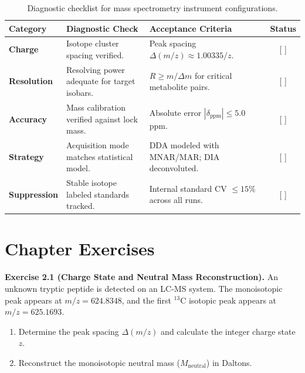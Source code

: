 \documentclass[11pt,twoside,openright]{book}
\begin{document}
\begin{table}[htbp]
\centering
\caption{Diagnostic checklist for mass spectrometry instrument configurations.}
\label{tab:ms_physics_checklist}
\small
\begin{tabularx}{\textwidth}{>{\raggedright\arraybackslash}l >{\raggedright\arraybackslash}p{5.2cm} >{\raggedright\arraybackslash}X c}
\toprule
\textbf{Category} & \textbf{Diagnostic Check} & \textbf{Acceptance Criteria} & \textbf{Status} \\
\midrule
\textbf{Charge} & Isotope cluster spacing verified. & Peak spacing $\Delta(m/z) \approx 1.00335/z$. & [ ] \\
\addlinespace
\textbf{Resolution} & Resolving power adequate for target isobars. & $R \ge m / \Delta m$ for critical metabolite pairs. & [ ] \\
\addlinespace
\textbf{Accuracy} & Mass calibration verified against lock mass. & Absolute error $|\delta_{\text{ppm}}| \le 5.0$ ppm. & [ ] \\
\addlinespace
\textbf{Strategy} & Acquisition mode matches statistical model. & DDA modeled with MNAR/MAR; DIA deconvoluted. & [ ] \\
\addlinespace
\textbf{Suppression} & Stable isotope labeled standards tracked. & Internal standard CV $\le 15\%$ across all runs. & [ ] \\
\bottomrule
\end{tabularx}
\end{table}

\FloatBarrier

\section{Chapter Exercises}
\label{sec:chapter_exercises}

\noindent\textbf{Exercise 2.1 (Charge State and Neutral Mass Reconstruction).}\enspace
\label{ex:charge_deconvolution}
An unknown tryptic peptide is detected on an LC-MS system. The monoisotopic peak appears at $m/z = 624.8348$, and the first $^{13}\text{C}$ isotopic peak appears at $m/z = 625.1693$.
\begin{enumerate}
    \item Determine the peak spacing $\Delta(m/z)$ and calculate the integer charge state $z$.
    \item Reconstruct the monoisotopic neutral mass ($M_{\text{neutral}}$) in Daltons.
\end{enumerate}
\end{document}
